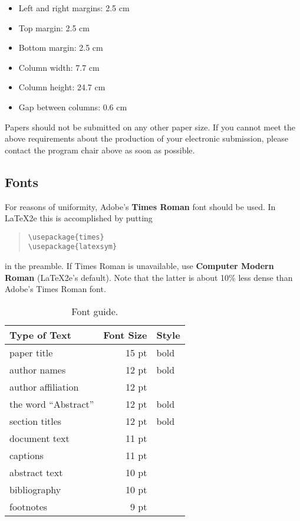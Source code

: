 \documentclass[11pt]{article}
\begin{document}
\begin{itemize}
\item Left and right margins: 2.5 cm
\item Top margin: 2.5 cm
\item Bottom margin: 2.5 cm
\item Column width: 7.7 cm
\item Column height: 24.7 cm
\item Gap between columns: 0.6 cm
\end{itemize}

\noindent Papers should not be submitted on any other paper size.
 If you cannot meet the above requirements about the production of your electronic submission, 
please contact the program chair above as soon as possible.

\subsection{Fonts}
\label{ssec:fonts}
For reasons of uniformity, Adobe's {\bf Times Roman} font should be
used. In \LaTeX2e{} this is accomplished by putting

\begin{quote}
\begin{verbatim}
\usepackage{times}
\usepackage{latexsym}
\end{verbatim}
\end{quote}
in the preamble. If Times Roman is unavailable, use {\bf Computer
  Modern Roman} (\LaTeX2e{}'s default).  Note that the latter is about
  10\% less dense than Adobe's Times Roman font.


\begin{table}[h]
\begin{center}
\begin{tabular}{|l|rl|}
\hline \bf Type of Text & \bf Font Size & \bf Style \\ \hline
paper title & 15 pt & bold \\
author names & 12 pt & bold \\
author affiliation & 12 pt & \\
the word ``Abstract'' & 12 pt & bold \\
section titles & 12 pt & bold \\
document text & 11 pt  &\\
captions & 11 pt & \\
abstract text & 10 pt & \\
bibliography & 10 pt & \\
footnotes & 9 pt & \\
\hline
\end{tabular}
\end{center}
\caption{\label{font-table} Font guide. }
\end{table}
\end{document}
